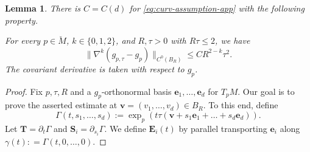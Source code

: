 \documentclass[11pt, letterpaper, reqno]{amsart}
\numberwithin{equation}{section}
\newtheorem{Lem}[Def]{Lemma}
\theoremstyle{remark}
\newcommand{\mbfE}{\mathbf{E}}
\newcommand{\mbfS}{\mathbf{S}}
\newcommand{\mbfT}{\mathbf{T}}
\newcommand{\mbfe}{\mathbf{e}}
\newcommand{\mbfv}{\mathbf{v}}
\begin{document}
\begin{Lem}\label{Lem:norm-coord-derivatives}
There is $C=C(d)$ for \eqref{eq:curv-assumption-app} with the following property.

For every $p\in \breve M$, $k\in \{0,1,2\}$, and $R, \tau >0$ with $R \tau \leq 2$, we have
\[
\rVert \nabla^k(g_{p,\tau}-g_p)\rVert_{C^0(B_R)} \leq C R^{2-k} \tau^2.
\]
The covariant derivative is taken with respect to $g_p$.
\end{Lem}
\begin{proof}
Fix $p,\tau,R$ and a $g_p$-orthonormal basis $\mbfe_1,\dots,\mbfe_d$ for $T_pM$. Our goal is to prove the asserted estimate at $\mbfv = (v_1,\dots,v_d) \in B_R$. To this end, define
\[
\Gamma(t,s_1,\dots,s_d) := \exp_p(t\tau(\mbfv + s_1\mbfe_1 + \dots + s_d\mbfe_d)). 
\]
Let $\mbfT=\partial_t \Gamma$ and $\mbfS_i = \partial_{s_i}\Gamma$. We define $\mbfE_i(t)$ by parallel transporting $\mbfe_i$ along $\gamma(t) : =\Gamma(t,0,\dots,0)$. 


\end{proof}
\end{document}

